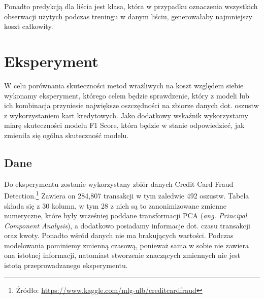 \documentclass[inzynierska]{pwr_wmat_praca_dyplomowa}
\theoremstyle{plain}
\numberwithin{theorem}{chapter}
\theoremstyle{definition}
\numberwithin{theorem}{chapter}
\begin{document}
Ponadto predykcją dla liścia jest klasa, która w przypadku oznaczenia wszystkich obserwacji użytych podczas treningu w danym liściu, generowałaby najmniejszy koszt całkowity.

\chapter{Eksperyment}
W celu porównania skuteczności metod wrażliwych na koszt względem siebie wykonamy eksperyment, którego celem będzie sprawdzenie, który z modeli lub ich kombinacja przyniesie największe oszczędności na zbiorze danych dot. oszustw z wykorzystaniem kart kredytowych. Jako dodatkowy wskaźnik wykorzystamy miarę skuteczności modelu F1 Score, która będzie w stanie odpowiedzieć, jak zmieniła się ogólna skuteczność modelu.


\section{Dane}
Do eksperymentu zostanie wykorzystany zbiór danych Credit Card Fraud Detection.\footnote{Źródło: \url{https://www.kaggle.com/mlg-ulb/creditcardfraud}} Zawiera on 284,807 transakcji w tym zaledwie 492 oszustw. Tabela składa się z 30 kolumn, w tym 28 z nich są to zanonimizowane zmienne numeryczne, które były wcześniej poddane transformacji PCA (\textit{ang. Principal Component Analysis}), a dodatkowo posiadamy informacje dot. czasu transakcji oraz kwoty. Ponadto wśród danych nie ma brakujących wartości. Podczas modelowania pominiemy zmienną czasową, ponieważ sama w sobie nie zawiera ona istotnej informacji, natomiast stworzenie znaczących zmiennych nie jest istotą przeprowadzanego eksperymentu. 
\end{document}
